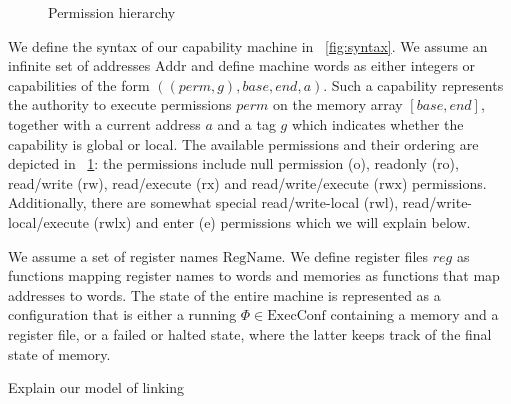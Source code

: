 \documentclass[compsoc,conference,letterpaper,fleqn]{IEEEtran}
\newcommand{\var}[1]{\mathit{#1}}
\newcommand{\gl}{\var{g}}
\newcommand{\addr}{\var{a}}
\newcommand{\start}{\var{base}}
\newcommand{\addrend}{\var{end}}
\newcommand{\reg}{\var{reg}}
\newcommand{\perm}{\var{perm}}
\newcommand{\plaindom}[1]{\mathrm{#1}}
\newcommand{\Addrs}{\plaindom{Addr}}
\newcommand{\ExecConfs}{\plaindom{ExecConf}}
\newcommand{\RegName}{\plaindom{RegName}}
\newcommand{\plainperm}[1]{\mathrm{#1}}
\newcommand{\noperm}{\plainperm{o}}
\newcommand{\readonly}{\plainperm{ro}}
\newcommand{\readwrite}{\plainperm{rw}}
\newcommand{\exec}{\plainperm{rx}}
\newcommand{\entry}{\plainperm{e}}
\newcommand{\rwx}{\plainperm{rwx}}
\newcommand{\readwritel}{\plainperm{rwl}}
\newcommand{\rwlx}{\plainperm{rwlx}}
\begin{document}
\begin{figure}
  \centering

  \caption{Permission hierarchy}
  \label{fig:perm-hier}
\end{figure}

We define the syntax of our capability machine in \figurename~\ref{fig:syntax}. We
assume an infinite set of addresses $\Addrs$ and define machine words as either
integers or capabilities of the form $((\perm,\gl),\start,\addrend,\addr)$. Such
a capability represents the authority to execute permissions $\perm$ on the
memory array $[\start,\addrend]$, together with a current address $\addr$ and a
tag $\gl$ which indicates whether the capability is global or local. The
available permissions and their ordering are depicted in
\figurename~\ref{fig:perm-hier}: the permissions include null permission ($\noperm$),
readonly ($\readonly$), read/write ($\readwrite$), read/execute ($\exec$) and
read/write/execute ($\rwx$) permissions. Additionally, there are somewhat
special read/write-local ($\readwritel$), read/write-local/execute ($\rwlx$) and
enter ($\entry$) permissions which we will explain below.

We assume a set of register names $\RegName$. We define register files $\reg$ as
functions mapping register names to words and memories as functions that map
addresses to words. The state of the entire machine is represented as a
configuration that is either a running $\Phi \in \ExecConfs$ containing a memory
and a register file, or a failed or halted state, where the latter keeps track
of the final state of memory.



Explain our model of linking
\end{document}
